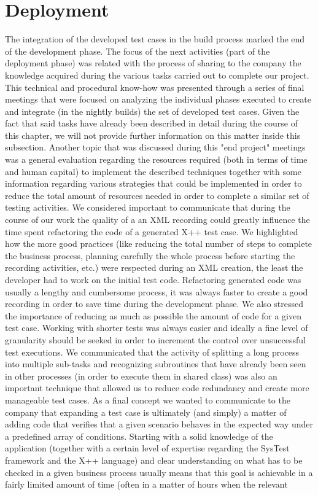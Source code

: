 \section{Deployment}

The integration of the developed test cases in the build process marked the end of the development phase. The focus of the next activities (part of the deployment phase) was related with the process of sharing to the company the knowledge acquired during the various tasks carried out to complete our project. This technical and procedural know-how was presented through a series of final meetings that were focused on analyzing the individual phases executed to create and integrate (in the nightly builds) the set of developed test cases. Given the fact that said tasks have already been described in detail during the course of this chapter, we will not provide further information on this matter inside this subsection. Another topic that was discussed during this "end project" meetings was a general evaluation regarding the resources required (both in terms of time and human capital) to implement the described techniques together with some information regarding various strategies that could be implemented in order to reduce the total amount of resources needed in order to complete a similar set of testing activities. We considered important to communicate that during the course of our work the quality of a an XML recording could greatly influence the time spent refactoring the code of a generated X++ test case. We highlighted how the more good practices (like reducing the total number of steps to complete the business process, planning carefully the whole process before starting the recording activities, etc.) were respected during an XML creation, the least the developer had to work on the initial test code. Refactoring generated code was usually a lengthy and cumbersome process, it was always faster to create a good recording in order to save time during the development phase. We also stressed the importance of reducing as much as possible the amount of code for a given test case. Working with shorter tests was always easier and ideally a fine level of granularity should be seeked in order to increment the control over unsuccessful test executions. We communicated that the activity of splitting a long process into multiple sub-tasks and recognizing subroutines that have already been seen in other processes (in order to execute them in shared class) was also an important technique that allowed us to reduce code redundancy and create more manageable test cases. As a final concept we wanted to communicate to the company that expanding a test case is ultimately (and simply) a matter of adding code that verifies that a given scenario behaves in the expected way under a predefined array of conditions. Starting with a solid knowledge of the application (together with a certain level of expertise regarding the SysTest framework and the X++ language) and clear understanding on what has to be checked in a given business process usually means that this goal is achievable in a fairly limited amount of time (often in a matter of hours when the relevant 